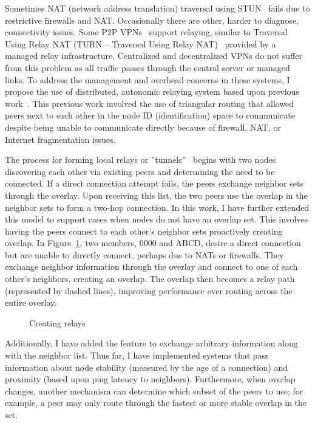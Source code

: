 Sometimes NAT (network address translation) traversal using STUN~\cite{stun}
fails due to restrictive firewalls and NAT.  Occasionally there are other,
harder to diagnose, connectivity issues.  Some P2P VPNs~\cite{hamachi, gbridge}
support relaying, similar to Traversal Using Relay NAT (TURN -- Traversal Using
Relay NAT)~\cite{turn} provided by a managed relay infrastructure.  Centralized
and decentralized VPNs do not suffer from this problem as all traffic passes
through the central server or managed links.  To address the management and
overhead concerns in these systems, I propose the use of distributed, autonomic
relaying system based upon previous work~\cite{hpdc08_0,epost}.  This previous
work involved the use of triangular routing that allowed peers next to each
other in the node ID (identification) space to communicate despite being unable
to communicate directly because of firewall, NAT, or Internet fragmentation
issues.

The process for forming local relays or ''tunnels''~\cite{hpdc08_0} begins with
two nodes discovering each other via existing peers and determining the need to
be connected.  If a direct connection attempt fails, the peers exchange
neighbor sets through the overlay.  Upon receiving this list, the two peers use
the overlap in the neighbor sets to form a two-hop connection.  In this work, I
have further extended this model to support cases when nodes do not have an
overlap set.  This involves having the peers connect to each other's neighbor
sets proactively creating overlap.  In Figure~\ref{fig:relay}, two members,
0000 and ABCD,  desire a direct connection but are unable to directly connect,
perhaps due to NATs or firewalls.  They exchange neighbor information through
the overlay and connect to one of each other's neighbors, creating an overlap.
The overlap then becomes a relay path (represented by dashed lines), improving
performance over routing across the entire overlay.

\begin{figure}
\centering
{}
\caption{Creating relays}
\label{fig:relay}
\end{figure}

Additionally, I have added the feature to exchange arbitrary information along
with the neighbor list.  Thus far, I have implemented systems that pass
information about node stability (measured by the age of a connection) and
proximity (based upon ping latency to neighbors).  Furthermore, when overlap
changes, another mechanism can determine which subset of the peers to use; for
example, a peer may only route through the fastest or more stable overlap in
the set.


